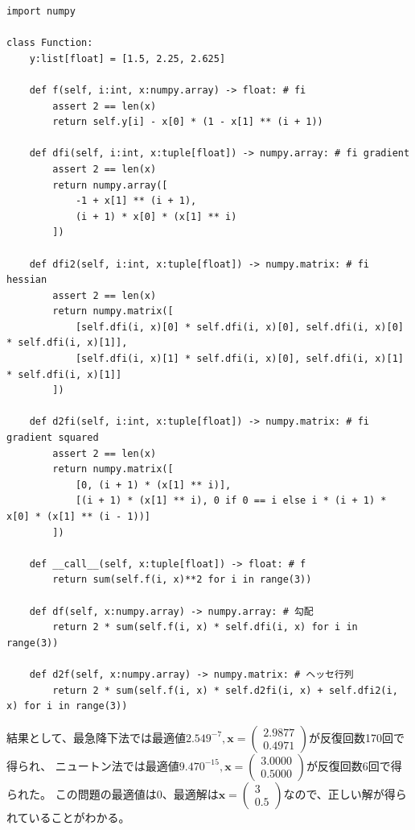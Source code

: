 \documentclass[a4j, titlepage]{jsarticle}
\numberwithin{equation}{section}
\begin{document}
        \begin{lstlisting}[caption=$f$の実装, label=src:5f]
import numpy

class Function:
    y:list[float] = [1.5, 2.25, 2.625]
    
    def f(self, i:int, x:numpy.array) -> float: # fi
        assert 2 == len(x)
        return self.y[i] - x[0] * (1 - x[1] ** (i + 1))
    
    def dfi(self, i:int, x:tuple[float]) -> numpy.array: # fi gradient
        assert 2 == len(x)
        return numpy.array([
            -1 + x[1] ** (i + 1),
            (i + 1) * x[0] * (x[1] ** i)
        ])
        
    def dfi2(self, i:int, x:tuple[float]) -> numpy.matrix: # fi hessian
        assert 2 == len(x)
        return numpy.matrix([
            [self.dfi(i, x)[0] * self.dfi(i, x)[0], self.dfi(i, x)[0] * self.dfi(i, x)[1]],
            [self.dfi(i, x)[1] * self.dfi(i, x)[0], self.dfi(i, x)[1] * self.dfi(i, x)[1]]
        ])
    
    def d2fi(self, i:int, x:tuple[float]) -> numpy.matrix: # fi gradient squared
        assert 2 == len(x)
        return numpy.matrix([
            [0, (i + 1) * (x[1] ** i)],
            [(i + 1) * (x[1] ** i), 0 if 0 == i else i * (i + 1) * x[0] * (x[1] ** (i - 1))]
        ])
    
    def __call__(self, x:tuple[float]) -> float: # f
        return sum(self.f(i, x)**2 for i in range(3))
    
    def df(self, x:numpy.array) -> numpy.array: # 勾配
        return 2 * sum(self.f(i, x) * self.dfi(i, x) for i in range(3))
    
    def d2f(self, x:numpy.array) -> numpy.matrix: # ヘッセ行列
        return 2 * sum(self.f(i, x) * self.d2fi(i, x) + self.dfi2(i, x) for i in range(3))
        \end{lstlisting}

        結果として、最急降下法では最適値$2.549^{-7}, \bm{x}=\begin{pmatrix}
            2.9877 \\
            0.4971
        \end{pmatrix}$が反復回数170回で得られ、
        ニュートン法では最適値$9.470^{-15}, \bm{x}=\begin{pmatrix}
            3.0000 \\
            0.5000
        \end{pmatrix}$が反復回数6回で得られた。
        この問題の最適値は0、最適解は$\bm{x}=\begin{pmatrix}
            3 \\
            0.5
        \end{pmatrix}$なので、正しい解が得られていることがわかる。
\end{document}
